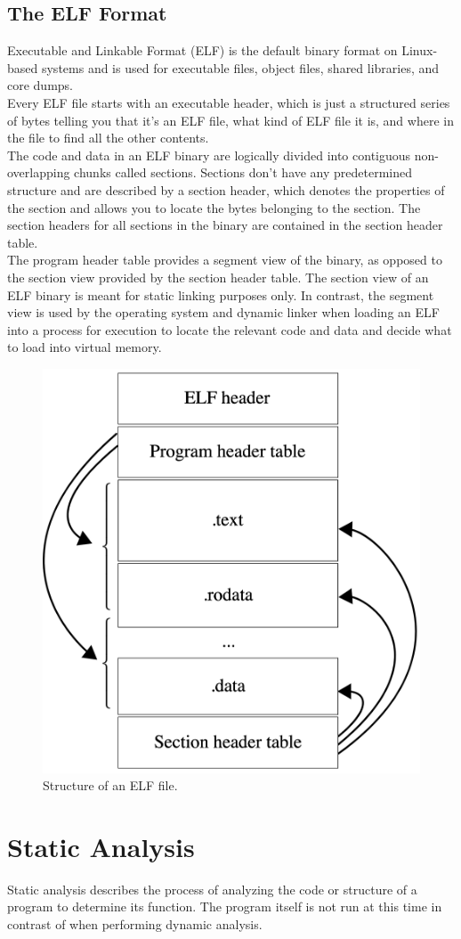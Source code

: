 \subsection{The ELF Format}
Executable and Linkable Format (ELF) is the default binary format on Linux-based systems and is used for executable files, object files, shared libraries, and core dumps. \\
Every ELF file starts with an executable header, which is just a structured series of bytes telling you that it’s an ELF file, what kind of ELF file it is, and where in the file to find all the other contents. \\
The code and data in an ELF binary are logically divided into contiguous non-overlapping chunks called sections. Sections don’t have any predetermined structure and are described by a section header, which denotes the properties of the section and allows you to locate the bytes belonging to the section. The section headers for all sections in the binary are contained in the section header table. \\
The program header table provides a segment view of the binary, as opposed to the section view provided by the section header table. The section view of an ELF binary is meant for static linking purposes only. In contrast, the segment view is used by the operating system and dynamic linker when loading an ELF into a process for execution to locate the relevant code and data and decide what to load into virtual memory.

\begin{figure}[H]
    \centering
    \includegraphics[width=0.45\linewidth]{Images/ELF.png}
    \caption{Structure of an ELF file.}
    \label{fig:ELF}
\end{figure}

\section{Static Analysis}
Static analysis describes the process of analyzing the code or structure of a program to determine its function. The program itself is not run at this time in contrast of when performing dynamic analysis.

